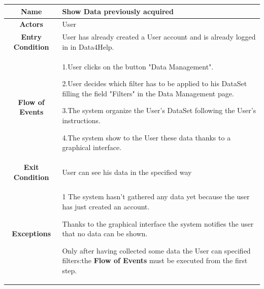       \begin{table}[h!]
        \centering
        \begin{tabularx}{\linewidth}{|c|X|}
          \hline

          \textbf{Name} & Show Data previously acquired\\
        	\hline

        	\textbf{Actors} & User\\
        	\hline

        	\textbf{Entry Condition} & User has already created a User account and is already logged in in Data4Help.\\
        	\hline

        	\textbf{Flow of Events} &
        					1.User clicks on the button "Data Management".

        					2.User decides which filter has to be applied to his DataSet filling the field "Filters" in the Data 						Management page.

        					3.The system organize the User's DataSet following the User's instructions.

        					4.The system show to the User these data thanks to a graphical interface. \\
        	\hline

        	\textbf{Exit Condition} & User can see his data in the specified way\\

        	\hline

        	\textbf{Exceptions} & 1 The system hasn't gathered any data yet because the user has just created an account.

        				Thanks to the graphical interface the system notifies the user that no data can be shown.

        				Only after having collected some data the User can specified filters:the \textbf{Flow of Events} must be 				executed from the first step.\\

          \hline

        \end{tabularx}
      \end{table}

   

